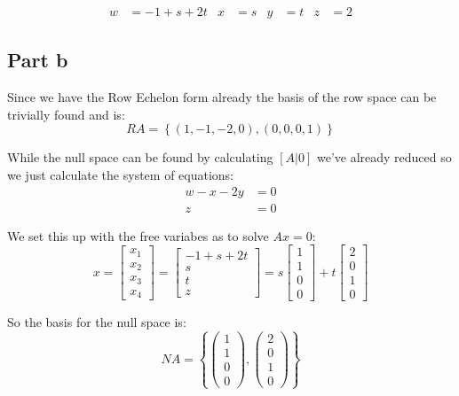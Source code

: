 \begin{align*}
	w & = -1 + s + 2t
	  & x             & = s
	  & y             & = t
	  & z             & = 2
\end{align*}

\subsection{Part b}
Since we have the Row Echelon form already the basis of the row space can be trivially found and is:
\[
	RA = \left\{(1,-1,-2,0), (0,0,0,1)\right\}
\]

While the null space can be found by calculating $[A|0]$ we've already reduced so we just calculate the system of equations:
\begin{align*}
	w-x-2y & = 0 \\
	z      & = 0
\end{align*}

We set this up with the free variabes as to solve $Ax=0$:
\[
	x = \begin{bmatrix}x_1\\x_2\\x_3\\x_4\end{bmatrix}=\begin{bmatrix}-1+s + 2t\\s\\t\\z\end{bmatrix}=s\begin{bmatrix}1\\1\\0\\0\end{bmatrix}+t\begin{bmatrix}2\\0\\1\\0\end{bmatrix}
\]

So the basis for the null space is:
\[
	NA = \left\{\begin{pmatrix}1\\1\\0\\0\end{pmatrix}, \begin{pmatrix}2\\0\\1\\0\end{pmatrix}\right\}
\]
